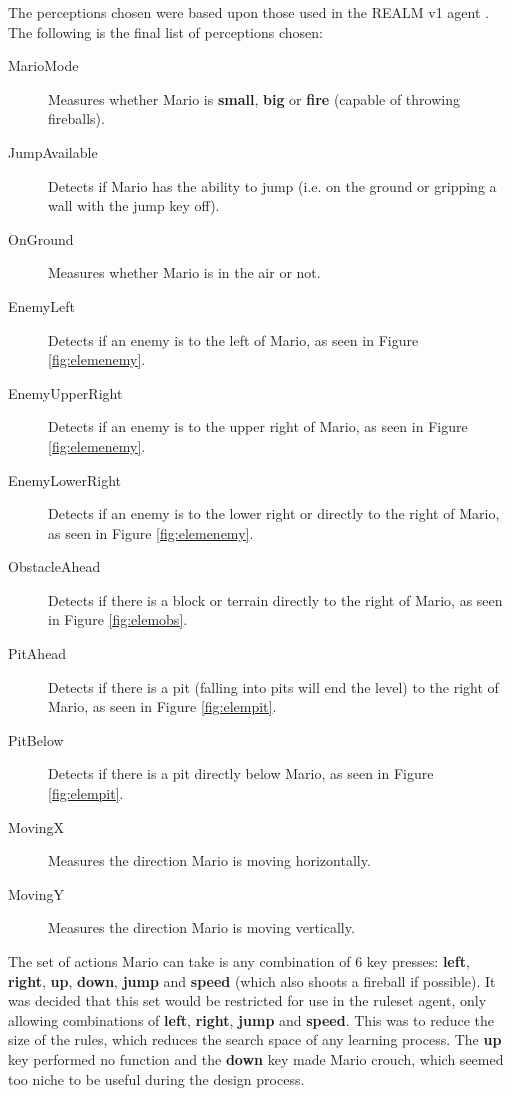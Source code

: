 The perceptions chosen were based upon those used in the REALM v1 agent \cite[p.~85]{realm}. The following is the final list of perceptions chosen:
\begin{description}
\item[MarioMode] Measures whether Mario is \textbf{small}, \textbf{big} or \textbf{fire} (capable of throwing fireballs).
\item[JumpAvailable] Detects if Mario has the ability to jump (i.e. on the ground or gripping a wall with the jump key off).
\item[OnGround] Measures whether Mario is in the air or not.
\item[EnemyLeft] Detects if an enemy is to the left of Mario, as seen in Figure \ref{fig:elemenemy}.
\item[EnemyUpperRight] Detects if an enemy is to the upper right of Mario, as seen in Figure \ref{fig:elemenemy}.
\item[EnemyLowerRight] Detects if an enemy is to the lower right or directly to the right of Mario, as seen in Figure \ref{fig:elemenemy}.
\item[ObstacleAhead] Detects if there is a block or terrain directly to the right of Mario, as seen in Figure \ref{fig:elemobs}.
\item[PitAhead] Detects if there is a pit (falling into pits will end the level) to the right of Mario, as seen in Figure \ref{fig:elempit}.
\item[PitBelow] Detects if there is a pit directly below Mario, as seen in Figure \ref{fig:elempit}.
\item[MovingX] Measures the direction Mario is moving horizontally.
\item[MovingY] Measures the direction Mario is moving vertically.
\end{description}

The set of actions Mario can take is any combination of 6 key presses: \textbf{left}, \textbf{right}, \textbf{up}, \textbf{down}, \textbf{jump} and \textbf{speed} (which also shoots a fireball if possible). It was decided that this set would be restricted for use in the ruleset agent, only allowing combinations of \textbf{left}, \textbf{right}, \textbf{jump} and \textbf{speed}. This was to reduce the size of the rules, which reduces the search space of any learning process. The \textbf{up} key performed no function and the \textbf{down} key made Mario crouch, which seemed too niche to be useful during the design process.



